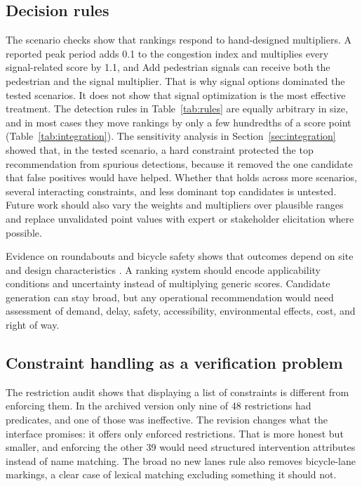 \documentclass[11pt]{article}
\begin{document}
\subsection{Decision rules}
The scenario checks show that rankings respond to hand-designed multipliers. A reported peak period adds 0.1 to the congestion index and multiplies every signal-related score by 1.1, and Add pedestrian signals can receive both the pedestrian and the signal multiplier. That is why signal options dominated the tested scenarios. It does not show that signal optimization is the most effective treatment. The detection rules in Table~\ref{tab:rules} are equally arbitrary in size, and in most cases they move rankings by only a few hundredths of a score point (Table~\ref{tab:integration}). The sensitivity analysis in Section~\ref{sec:integration} showed that, in the tested scenario, a hard constraint protected the top recommendation from spurious detections, because it removed the one candidate that false positives would have helped. Whether that holds across more scenarios, several interacting constraints, and less dominant top candidates is untested. Future work should also vary the weights and multipliers over plausible ranges and replace unvalidated point values with expert or stakeholder elicitation where possible.

Evidence on roundabouts and bicycle safety shows that outcomes depend on site and design characteristics \citep{gross2013,poudel2021}. A ranking system should encode applicability conditions and uncertainty instead of multiplying generic scores. Candidate generation can stay broad, but any operational recommendation would need assessment of demand, delay, safety, accessibility, environmental effects, cost, and right of way.

\subsection{Constraint handling as a verification problem}
The restriction audit shows that displaying a list of constraints is different from enforcing them. In the archived version only nine of 48 restrictions had predicates, and one of those was ineffective. The revision changes what the interface promises: it offers only enforced restrictions. That is more honest but smaller, and enforcing the other 39 would need structured intervention attributes instead of name matching. The broad no new lanes rule also removes bicycle-lane markings, a clear case of lexical matching excluding something it should not.
\end{document}
